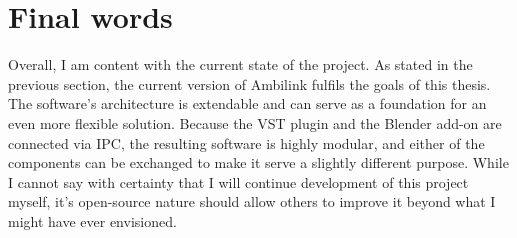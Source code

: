 \section{Final words}
Overall, I am content with the current state of the project. As stated in the previous section, 
the current version of Ambilink fulfils the goals of this thesis. 
The software's architecture is extendable and can serve as a foundation for an even more flexible solution.
Because the VST plugin and the Blender add-on are connected via IPC, the resulting software is highly modular,
and either of the components can be exchanged to make it serve a slightly different purpose.
While I cannot say with certainty that I will continue development of this project myself, 
it's open-source nature should allow others to improve it beyond what I might have ever envisioned.
